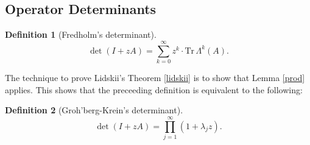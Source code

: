 \documentclass[a4paper, 10pt]{article}
\newcommand{\Tr}{\textrm{Tr}\,}
\theoremstyle{definition}
\newtheorem{definition}{Definition}[section]
\theoremstyle{remark}
\theoremstyle{remark}
\begin{document}
\subsection{Operator Determinants}

\begin{definition}[Fredholm's determinant]
    \begin{equation}
        \det (I + z A) = \sum_{k=0}^{\infty} z^k \cdot \Tr \Lambda^k (A) . 
    \end{equation}
\end{definition}

The technique to prove Lidskii's Theorem \ref{lidskii} is to show that Lemma \ref{prod} applies. This shows that the preceeding definition is equivalent to the following: 

\begin{definition}[Groh'berg-Krein's determinant]
    \begin{equation}
        \det (I + z A) = \prod_{j=1}^{\infty} (1 + \lambda_j z) . 
    \end{equation}
\end{definition}


\end{document}
